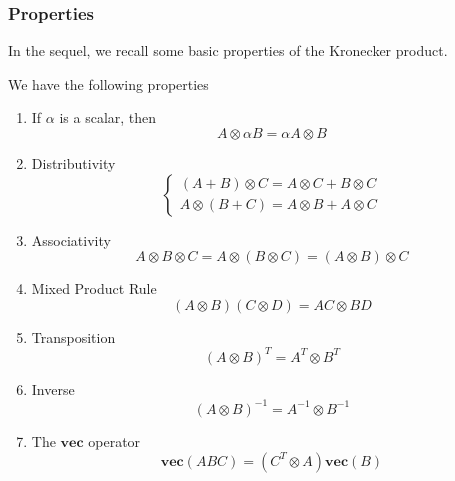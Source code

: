 \subsubsection*{Properties}
In the sequel, we recall some basic properties of the Kronecker product.
\begin{proposition}
  We have the following properties
  \begin{enumerate}[label=(\alph*).]
    \item If $\alpha$ is a scalar, then 
      \begin{equation}
      A \otimes \alpha B = \alpha A \otimes B
      \end{equation}
    \item Distributivity 
      \begin{equation}
        \begin{cases}
          ( A + B ) \otimes C = A \otimes C + B \otimes C \\
          A \otimes ( B + C ) = A \otimes B + A \otimes C
        \end{cases}
      \end{equation}
    \item Associativity      
      \begin{equation}
      A \otimes B \otimes C = A \otimes ( B \otimes C ) = ( A \otimes B ) \otimes C
      \end{equation}
    \item  Mixed Product Rule 
      \begin{equation}
      ( A \otimes B ) ( C \otimes D ) = AC \otimes BD
      \end{equation}
    \item Transposition      
      \begin{equation}
      ( A \otimes B )^T = A^T \otimes B^T
      \end{equation}
    \item Inverse      
      \begin{equation}
      ( A \otimes B )^{-1} = A^{-1} \otimes B^{-1}
      \end{equation}
    \item The $\mathbf{vec}$ operator      
      \begin{equation}
      \label{kronecker_vec_abc}
      \mathbf{vec} ( ABC ) = ( C^T \otimes A ) \mathbf{vec} ( B )

\end{equation}
\end{enumerate}
\end{proposition}
